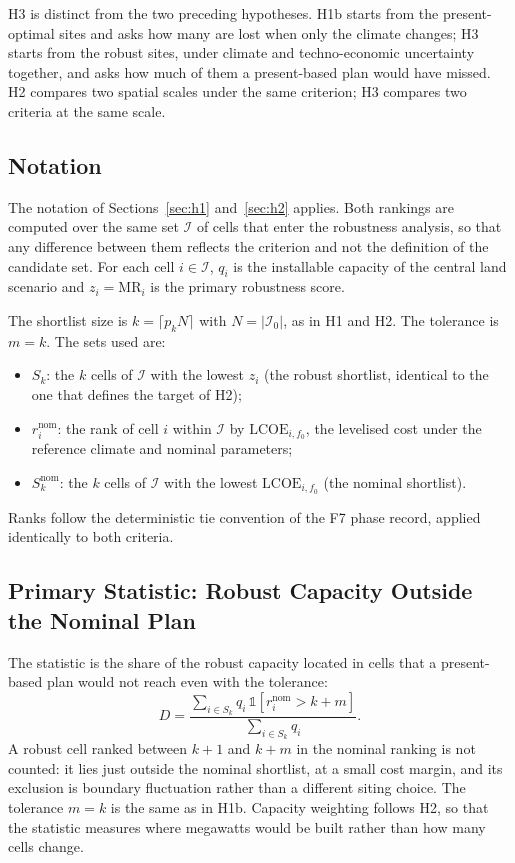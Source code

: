 H3 is distinct from the two preceding hypotheses. H1b starts from the
present-optimal sites and asks how many are lost when only the climate changes;
H3 starts from the robust sites, under climate and techno-economic uncertainty
together, and asks how much of them a present-based plan would have missed. H2
compares two spatial scales under the same criterion; H3 compares two criteria
at the same scale.

\subsection{Notation}
\label{subsec:h3_notation}

The notation of Sections~\ref{sec:h1} and~\ref{sec:h2} applies. Both rankings
are computed over the same set $\mathcal{I}$ of cells that enter the robustness
analysis, so that any difference between them reflects the criterion and not the
definition of the candidate set. For each cell $i\in\mathcal{I}$, $q_i$ is the
installable capacity of the central land scenario and
$z_i=\mathrm{MR}_i$ is the primary robustness score.

The shortlist size is $k=\lceil p_k N\rceil$ with $N=|\mathcal{I}_0|$, as in H1
and H2. The tolerance is $m=k$. The sets used are:
\begin{itemize}
    \item $S_k$: the $k$ cells of $\mathcal{I}$ with the lowest $z_i$ (the
    robust shortlist, identical to the one that defines the target of H2);
    \item $r^{\mathrm{nom}}_i$: the rank of cell $i$ within $\mathcal{I}$ by
    $\mathrm{LCOE}_{i,f_0}$, the levelised cost under the reference climate and
    nominal parameters;
    \item $S^{\mathrm{nom}}_k$: the $k$ cells of $\mathcal{I}$ with the lowest
    $\mathrm{LCOE}_{i,f_0}$ (the nominal shortlist).
\end{itemize}
Ranks follow the deterministic tie convention of the F7 phase record, applied
identically to both criteria.

\subsection{Primary Statistic: Robust Capacity Outside the Nominal Plan}
\label{subsec:h3_statistic}

The statistic is the share of the robust capacity located in cells that a
present-based plan would not reach even with the tolerance:
\begin{equation}
    D=\frac{\sum_{i\in S_k}q_i\,\mathbb{1}\!\left[r^{\mathrm{nom}}_i>k+m\right]}
    {\sum_{i\in S_k}q_i}.
    \label{eq:h3_statistic}
\end{equation}
A robust cell ranked between $k+1$ and $k+m$ in the nominal ranking is not
counted: it lies just outside the nominal shortlist, at a small cost margin, and
its exclusion is boundary fluctuation rather than a different siting choice. The
tolerance $m=k$ is the same as in H1b. Capacity weighting follows H2, so that the
statistic measures where megawatts would be built rather than how many cells
change.

